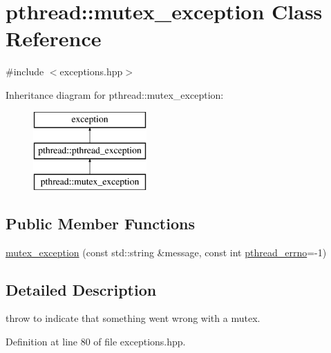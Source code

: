 \hypertarget{classpthread_1_1mutex__exception}{\section{pthread\+:\+:mutex\+\_\+exception Class Reference}
\label{classpthread_1_1mutex__exception}
}


{\ttfamily \#include $<$exceptions.\+hpp$>$}

Inheritance diagram for pthread\+:\+:mutex\+\_\+exception\+:\begin{figure}[H]
\begin{center}
\leavevmode
\includegraphics[height=3.000000cm]{classpthread_1_1mutex__exception}
\end{center}
\end{figure}
\subsection*{Public Member Functions}
\begin{DoxyCompactItemize}
\item 
\hyperlink{classpthread_1_1mutex__exception_a257c627226859a3f8937a29974b2c915}{mutex\+\_\+exception} (const std\+::string \&message, const int \hyperlink{classpthread_1_1pthread__exception_a4a869173054faca1945ac1a7729082d6}{pthread\+\_\+errno}=-\/1)
\end{DoxyCompactItemize}


\subsection{Detailed Description}
throw to indicate that something went wrong with a mutex. 

Definition at line 80 of file exceptions.\+hpp.



